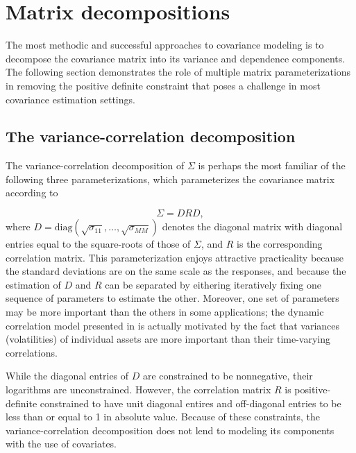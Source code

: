
\section{Matrix decompositions} \label{chapter-1-matrix-decompositions}
The most methodic and successful approaches to covariance modeling is to decompose the covariance matrix into its variance and dependence components. The following section demonstrates the role of multiple matrix parameterizations in removing the positive definite constraint that poses a challenge in most covariance estimation settings.

\subsection{The variance-correlation decomposition}

The variance-correlation decomposition of $\Sigma$ is perhaps the most familiar of the following three parameterizations, which parameterizes the covariance matrix according to

\begin{equation}\label{eq:variance-correlation-decomposition}
\Sigma = DRD,
\end{equation}
\noindent
where $D = \mbox{diag}\left(\sqrt{\sigma_{11}},\dots , \sqrt{\sigma_{MM}}\right)$ denotes the diagonal matrix with diagonal entries equal to the square-roots of those of $\Sigma$, and $R$ is the corresponding correlation matrix. This parameterization enjoys attractive practicality because the standard deviations are on the same scale as the responses, and because the estimation of $D$ and $R$ can be separated by eithering iteratively fixing one sequence of parameters to estimate the other. Moreover, one set of parameters may be more important than the others in some applications; the dynamic correlation model presented in \cite{engle2002dynamic} is actually motivated by the fact that variances (volatilities) of individual assets are more important than their time-varying correlations.
\bigskip

While the diagonal entries of $D$ are constrained to be nonnegative, their logarithms are unconstrained. However, the correlation matrix $R$ is positive-definite constrained to have unit diagonal entires and off-diagonal entries to be less than or equal to 1 in absolute value. Because of these constraints, the variance-correlation decomposition does not lend to modeling its components with the use of covariates.

